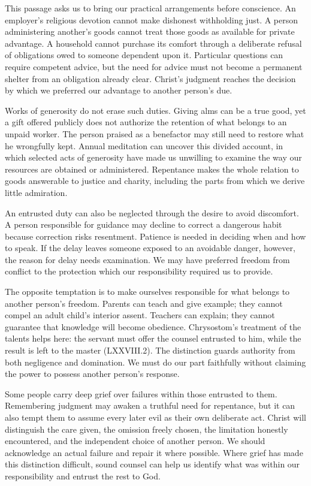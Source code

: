 This passage asks us to bring our practical arrangements before conscience. An employer's religious devotion cannot make dishonest withholding just. A person administering another's goods cannot treat those goods as available for private advantage. A household cannot purchase its comfort through a deliberate refusal of obligations owed to someone dependent upon it. Particular questions can require competent advice, but the need for advice must not become a permanent shelter from an obligation already clear. Christ's judgment reaches the decision by which we preferred our advantage to another person's due.

Works of generosity do not erase such duties. Giving alms can be a true good, yet a gift offered publicly does not authorize the retention of what belongs to an unpaid worker. The person praised as a benefactor may still need to restore what he wrongfully kept. Annual meditation can uncover this divided account, in which selected acts of generosity have made us unwilling to examine the way our resources are obtained or administered. Repentance makes the whole relation to goods answerable to justice and charity, including the parts from which we derive little admiration.

An entrusted duty can also be neglected through the desire to avoid discomfort. A person responsible for guidance may decline to correct a dangerous habit because correction risks resentment. Patience is needed in deciding when and how to speak. If the delay leaves someone exposed to an avoidable danger, however, the reason for delay needs examination. We may have preferred freedom from conflict to the protection which our responsibility required us to provide.

The opposite temptation is to make ourselves responsible for what belongs to another person's freedom. Parents can teach and give example; they cannot compel an adult child's interior assent. Teachers can explain; they cannot guarantee that knowledge will become obedience. Chrysostom's treatment of the talents helps here: the servant must offer the counsel entrusted to him, while the result is left to the master (LXXVIII.2). The distinction guards authority from both negligence and domination. We must do our part faithfully without claiming the power to possess another person's response.

Some people carry deep grief over failures within those entrusted to them. Remembering judgment may awaken a truthful need for repentance, but it can also tempt them to assume every later evil as their own deliberate act. Christ will distinguish the care given, the omission freely chosen, the limitation honestly encountered, and the independent choice of another person. We should acknowledge an actual failure and repair it where possible. Where grief has made this distinction difficult, sound counsel can help us identify what was within our responsibility and entrust the rest to God.

